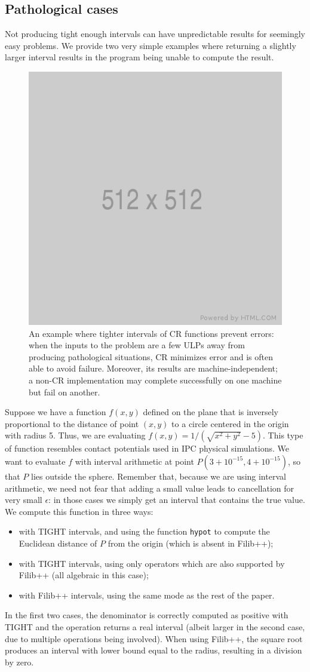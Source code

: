 
\subsection{Pathological cases}
Not producing tight enough intervals can have unpredictable results for seemingly easy problems. We provide two very simple examples where returning a slightly larger interval results in the program being unable to compute the result.

\begin{figure}
	\includegraphics[width=0.4\linewidth]{fig/512x512.png}
	\centering
	\caption{An example where tighter intervals of CR functions prevent errors: when the inputs to the problem are a few ULPs away from producing pathological situations, CR minimizes error and is often able to avoid failure. Moreover, its results are machine-independent; a non-CR implementation may complete successfully on one machine but fail on another.}
	\label{fig:tori}
\end{figure}
Suppose we have a function $f(x,y)$ defined on the plane that is inversely proportional to the distance of point $(x,y)$ to a circle centered in the origin with radius 5.
Thus, we are evaluating $f(x,y) = 1/(\sqrt{x^2 + y^2}-5)$.
This type of function resembles contact potentials used in IPC physical simulations.
We want to evaluate $f$ with interval arithmetic at point $P(3+10^{-15},4+10^{-15})$, so that $P$ lies outside the sphere. Remember that, because we are using interval arithmetic, we need not fear that adding a small value leads to cancellation for very small $\epsilon$: in those cases we simply get an interval that contains the true value.
We compute this function in three ways:
\begin{itemize}
	\item with TIGHT intervals, and using the function \texttt{hypot} to compute the Euclidean distance of $P$ from the origin (which is absent in Filib++);
	\item with TIGHT intervals, using only operators which are also supported by Filib++ (all algebraic in this case);
	\item with Filib++ intervals, using the same mode as the rest of the paper.
\end{itemize}
In the first two cases, the denominator is correctly computed as positive with TIGHT and the operation returns a real interval (albeit larger in the second case, due to multiple operations being involved).
When using Filib++, the square root produces an interval with lower bound equal to the radius, resulting in a division by zero.

